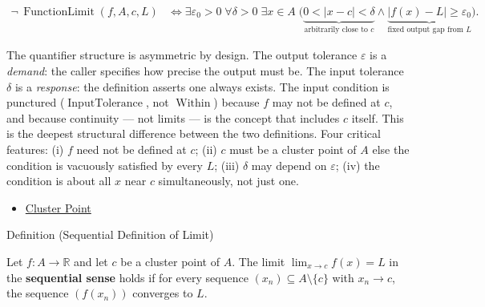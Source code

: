 \begin{remark*}
\[
\begin{aligned}
  \neg\,\operatorname{FunctionLimit}(f,A,c,L)
  &\Longleftrightarrow
  \exists \varepsilon_0>0\;
  \forall \delta>0\;
  \exists x\in A\;
  \bigl(
    \underbrace{0<|x-c|<\delta}_{\text{arbitrarily close to }c}
    \wedge
    \underbrace{|f(x)-L|\geq\varepsilon_0}_{\text{fixed output gap from }L}
  \bigr).
\end{aligned}
\]
\end{remark*}

\begin{remark*}[Interpretation]
The quantifier structure is asymmetric by design. The output
tolerance $\varepsilon$ is a \emph{demand}: the caller specifies how
precise the output must be. The input tolerance $\delta$ is a
\emph{response}: the definition asserts one always exists. The input
condition is punctured ($\operatorname{InputTolerance}$, not
$\operatorname{Within}$) because $f$ may not be defined at $c$, and
because continuity — not limits — is the concept that includes $c$
itself. This is the deepest structural difference between the two
definitions. Four critical features: (i) $f$ need not be defined at
$c$; (ii) $c$ must be a cluster point of $A$ else the condition is
vacuously satisfied by every $L$; (iii) $\delta$ may depend on
$\varepsilon$; (iv) the condition is about all $x$ near $c$
simultaneously, not just one.
\end{remark*}

\begin{dependencies}
\begin{itemize}
  \item \hyperref[def:cluster-point-r]{Cluster Point}
\end{itemize}
\end{dependencies}


\begin{definitionbox}{Definition (Sequential Definition of Limit)}
\begin{definition}
\label{def:limit-function-sequential}
Let $f : A \to \mathbb{R}$ and let $c$ be a cluster point of $A$.
The limit $\lim_{x \to c} f(x) = L$ in the \textbf{sequential
sense} holds if for every sequence $(x_n) \subseteq A \setminus \{c\}$
with $x_n \to c$, the sequence $(f(x_n))$ converges to $L$.
\end{definition}
\end{definitionbox}

